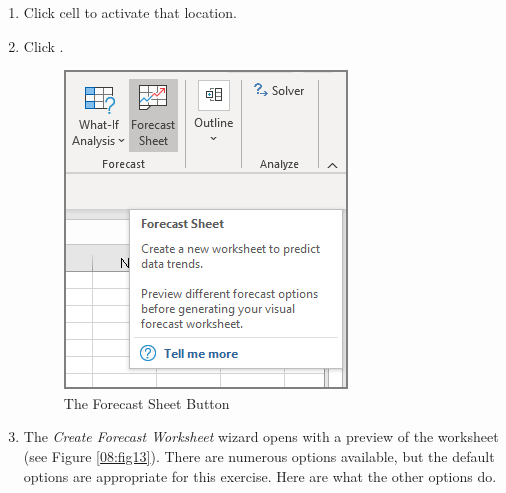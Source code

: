 \begin{enumbox}
	\begin{enumerate}
		\item Click cell  to activate that location.
		\item Click .

		\begin{figure}[H]
			\centering
			\includegraphics[width=\maxwidth{.65\linewidth}]{gfx/ch08_fig11}
			\caption{The Forecast Sheet Button}
			\label{08:fig11}
		\end{figure}

		\item The \textit{Create Forecast Worksheet} wizard opens with a preview of the worksheet (see Figure \ref{08:fig13}). There are numerous options available, but the default options are appropriate for this exercise. Here are what the other options do.
		

\end{enumerate}
\end{enumbox}
